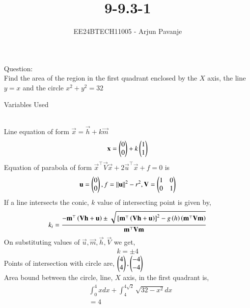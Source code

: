 \documentclass[journal]{IEEEtran}
\begin{document}

\vspace{3cm}
	
\title{9-9.3-1}
\author{EE24BTECH11005 - Arjun Pavanje}
{\let\newpage\relax\maketitle}
Question:\\
Find the area of the region in the first quadrant enclosed by the $X$ axis, the line $y=x$ and the circle $x^2+y^2=32$
\begin{table}[h!]    
  \centering
  
  \caption{Variables Used}
  \label{tab1-1.9-6}
\end{table}\\
\solution
Line equation of form $\vec{x}=\vec{h}+k\vec{m}$
\begin{align}
\mathbf{x}=\begin{pmatrix}0\\0\end{pmatrix}+k\begin{pmatrix}1\\1\end{pmatrix}
\end{align}
Equation of parabola of form $\vec{x}^{\top}\vec{V}\vec{x}+2\vec{u}^{\top}\vec{x}+f=0$ is
\begin{align}
	\mathbf{u}=\begin{pmatrix}0\\0\end{pmatrix},f=\left\lVert\mathbf{u}\right\rVert^2-r^2,\mathbf{V}=\begin{pmatrix}1&0\\0&1\end{pmatrix}
\end{align}
If a line intersects the conic, $k$ value of intersecting point is given by,
\begin{align}
	k_i=\frac{-\mathbf{m}^{\top}\left(\mathbf{Vh}+\mathbf{u}\right)\pm\sqrt{{}\left[\mathbf{m}^{\top}\left(\mathbf{Vh}+\mathbf{u}\right)\right]^2-g\left(h\right)\left(\mathbf{m}^{\top}\mathbf{Vm}\right)}}{\mathbf{m}^{\top}\mathbf{Vm}}
\end{align}
On substituting values of $\vec{u},\vec{m},\vec{h},\vec{V}$ we get,
\begin{align}
	k=\pm4
\end{align}
Points of intersection with circle are, $\begin{pmatrix}4\\4\end{pmatrix},\begin{pmatrix}-4\\-4\end{pmatrix}$\\
Area bound between the circle, line, $X$ axis, in the first quadrant is,
\begin{align}
	&\int_0^4 xdx+\int_4^{4\sqrt{2}} \sqrt{32-x^2}dx\\
	&=4
\end{align}
\end{document}
